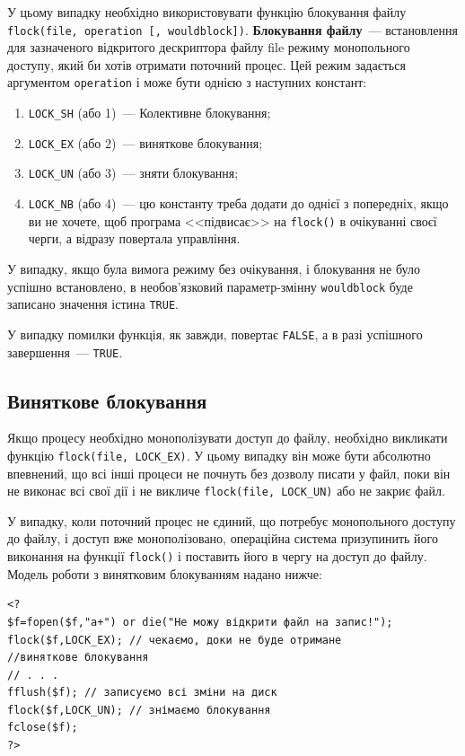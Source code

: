 У цьому випадку необхідно використовувати функцію блокування файлу \verb'flock(file, operation [, wouldblock])'. \textbf{Блокування файлу}~--- встановлення для зазначеного відкритого дескриптора файлу file режиму монопольного доступу, який би хотів отримати поточний процес. Цей режим задається аргументом \verb'operation' і може бути однією з наступних констант:
\begin{enumerate}
\item \verb'LOCK_SH' (або 1)~--- Колективне блокування;
\item \verb'LOCK_EX' (або 2)~--- виняткове блокування;
\item \verb'LOCK_UN' (або 3)~--- зняти блокування;
\item \verb'LOCK_NB' (або 4)~--- цю константу треба додати до однієї з попередніх, якщо ви не хочете, щоб програма <<підвисає>> на \verb'flock()' в очікуванні своєї черги, а відразу повертала управління.
\end{enumerate}
У випадку, якщо була вимога режиму без очікування, і блокування не було успішно встановлено, в необов'язковий параметр-змінну \verb'wouldblock' буде записано значення істина \verb'TRUE'.

У випадку помилки функція, як завжди, повертає \verb'FALSE', а в разі успішного завершення~--- \verb'TRUE'.


\subsection*{Виняткове блокування}
Якщо процесу необхідно монополізувати доступ до файлу, необхідно викликати функцію  \verb'flock(file, LOCK_EX)'. У цьому випадку він може бути абсолютно впевнений, що всі інші процеси не почнуть без дозволу писати у файл, поки він не виконає всі свої дії і не викличе \verb'flock(file, LOCK_UN)' або не закриє файл.

У випадку, коли поточний процес не єдиний, що потребує монопольного доступу до файлу, і доступ вже монополізовано, операційна система призупинить його виконання на функції \verb'flock()' і поставить його в чергу на доступ до файлу. Модель роботи з винятковим блокуванням надано нижче:


\begin{lstlisting}[caption=Виняткове блокування файлу]
<?
$f=fopen($f,"a+") or die("Не можу відкрити файл на запис!");
flock($f,LOCK_EX); // чекаємо, доки не буде отримане 
//виняткове блокування
// . . .
fflush($f); // записуємо всі зміни на диск
flock($f,LOCK_UN); // знімаємо блокування
fclose($f);
?>
\end{lstlisting}

